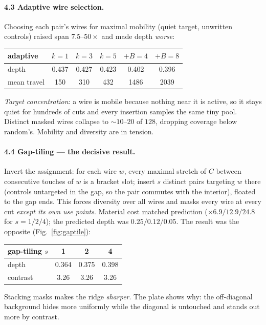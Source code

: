 \documentclass[11pt]{article}
\begin{document}
\paragraph{4.3 Adaptive wire selection.} Choosing each pair's wires for
maximal mobility (quiet target, unwritten controls) raised span $7.5$--$50\times$
and made depth \emph{worse}:
\begin{center}
\begin{tabular}{lccccc}
\toprule
adaptive & $k{=}1$ & $k{=}3$ & $k{=}5$ & $+B{=}4$ & $+B{=}8$\\
\midrule
depth & 0.437 & 0.427 & 0.423 & 0.402 & 0.396\\
mean travel & 150 & 310 & 432 & 1486 & 2039\\
\bottomrule
\end{tabular}
\end{center}
\emph{Target concentration}: a wire is mobile because nothing near it is
active, so it stays quiet for hundreds of cuts and every insertion samples the
same tiny pool. Distinct masked wires collapse to ${\sim}10$--$20$ of $128$,
dropping coverage below random's. Mobility and diversity are in tension.

\paragraph{4.4 Gap-tiling --- the decisive result.} Invert the assignment: for
each wire $w$, every maximal stretch of $C$ between consecutive touches of $w$
is a bracket slot; insert $s$ distinct pairs targeting $w$ there (controls
untargeted in the gap, so the pair commutes with the interior), floated to the
gap ends. This forces diversity over all wires and masks every wire at every
cut \emph{except its own use points}. Material cost matched prediction
($\times6.9/12.9/24.8$ for $s=1/2/4$); the predicted depth was $0.25/0.12/0.05$.
The result was the opposite (Fig.~\ref{fig:gaptile}):
\begin{center}
\begin{tabular}{lccc}
\toprule
gap-tiling $s$ & 1 & 2 & 4\\
\midrule
depth & 0.364 & 0.375 & 0.398\\
contrast & 3.26 & 3.26 & 3.26\\
\bottomrule
\end{tabular}
\end{center}
Stacking masks makes the ridge \emph{sharper}. The plate shows why: the
off-diagonal background hides more uniformly while the diagonal is untouched
and stands out more by contrast.
\end{document}
